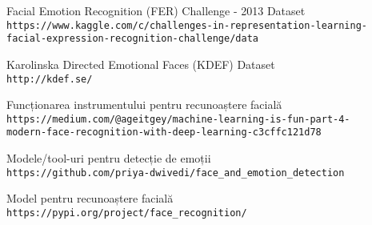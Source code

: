 \documentclass{article}
\begin{document}
\begin{thebibliography}{3}
Facial Emotion Recognition (FER) Challenge - 2013 Dataset
\\\texttt{https://www.kaggle.com/c/challenges-in-representation-learning-\\facial-expression-recognition-challenge/data}

Karolinska Directed Emotional Faces (KDEF) Dataset
\\\texttt{http://kdef.se/}

Funcționarea instrumentului pentru recunoaștere facială
\\\texttt{https://medium.com/@ageitgey/machine-learning-is-fun-part-4-\\modern-face-recognition-with-deep-learning-c3cffc121d78}

Modele/tool-uri pentru detecție de emoții 
\\\texttt{https://github.com/priya-dwivedi/face\_and\_emotion\_detection}

Model pentru recunoaștere facială \newline
\texttt{https://pypi.org/project/face\_recognition/}
\end{thebibliography}
\end{document}
